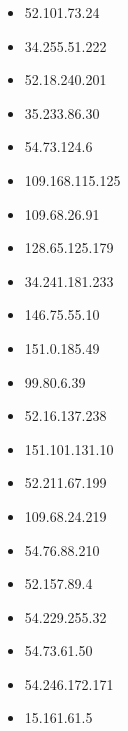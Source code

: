 \documentclass{article}
\begin{document}
\begin{itemize}
            \item 52.101.73.24
        
            \item 34.255.51.222
        
            \item 52.18.240.201
        
            \item 35.233.86.30
        
            \item 54.73.124.6
        
            \item 109.168.115.125
        
            \item 109.68.26.91
        
            \item 128.65.125.179
        
            \item 34.241.181.233
        
            \item 146.75.55.10
        
            \item 151.0.185.49
        
            \item 99.80.6.39
        
            \item 52.16.137.238
        
            \item 151.101.131.10
        
            \item 52.211.67.199
        
            \item 109.68.24.219
        
            \item 54.76.88.210
        
            \item 52.157.89.4
        
            \item 54.229.255.32
        
            \item 54.73.61.50
        
            \item 54.246.172.171
        
            \item 15.161.61.5
        

\end{itemize}
\end{document}
